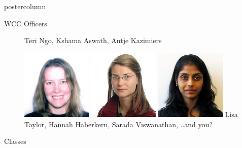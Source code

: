 \documentclass{beamer}
\begin{document}
\begin{frame}
\begin{columns}
\begin{column}{.33\textwidth}
\begin{beamercolorbox}[center,wd=\textwidth]{postercolumn}
\begin{minipage}[T]{.95\textwidth}
{\begin{myblock}{WCC Officers}
\begin{addmargin}[1em]{1em}
\begin{figure}
                                Teri Ngo, Kshama Aswath, Antje Kazimiers
                                \label{fig:workspace}
                                \vspace{1.3cm}
                            \end{figure}
                            \begin{figure}
                                \centering\includegraphics[width=0.3\textwidth]{img/lisa.png}
                                \centering\includegraphics[width=0.3\textwidth]{img/hannah.jpg}
                                \centering\includegraphics[width=0.3\textwidth]{img/sarada.jpg}
                                Lisa Taylor, Hannah Haberkern, Sarada Viswanathan, ..and you?
                                \label{fig:workspace}
                                \vspace{1.3cm}
                            \end{figure}
                        \end{addmargin}
                    \end{myblock}
                    \vspace{1.25cm}
                    \begin{myblock}{Classes}
                        \begin{addmargin}[1em]{1em}

\end{addmargin}
\end{myblock}}
\end{minipage}
\end{beamercolorbox}
\end{column}
\end{columns}
\end{frame}
\end{document}
